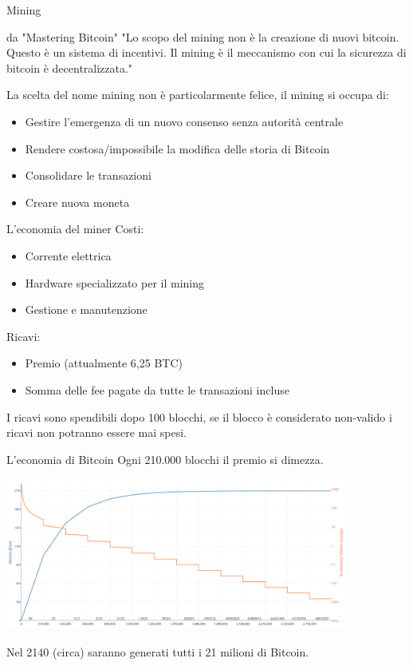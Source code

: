 \documentclass[aspectratio=169]{beamer}
\begin{document}
\begin{frame}{Mining}
    \begin{alertblock}{da "Mastering Bitcoin"}
        "Lo scopo del mining non è la creazione di nuovi bitcoin. Questo è un sistema di incentivi. Il mining è il meccanismo con cui la
        sicurezza di bitcoin è decentralizzata."
    \end{alertblock}

    La scelta del nome mining non è particolarmente felice, il mining si occupa di:
    \begin{itemize}
        \item Gestire l'emergenza di un nuovo consenso senza autorità centrale
        \item Rendere costosa/impossibile la modifica delle storia di Bitcoin
        \item Consolidare le transazioni
        \item Creare nuova moneta
    \end{itemize}
\end{frame}

\begin{frame}{L'economia del miner}
    Costi:
    \begin{itemize}
        \item Corrente elettrica
        \item Hardware specializzato per il mining
        \item Gestione e manutenzione
    \end{itemize}

    Ricavi:
    \begin{itemize}
        \item Premio (attualmente 6,25 BTC)
        \item Somma delle fee pagate da tutte le transazioni incluse
    \end{itemize}

    I ricavi sono spendibili dopo 100 blocchi, se il blocco è considerato non-valido i ricavi non potranno essere mai spesi.
\end{frame}

\begin{frame}{L'economia di Bitcoin}
    Ogni 210.000 blocchi il premio si dimezza.
    \begin{center}
        \includegraphics[height=5cm]{halving.png}
    \end{center}
    Nel 2140 (circa) saranno generati tutti i 21 milioni di Bitcoin.
\end{frame}
\end{document}
